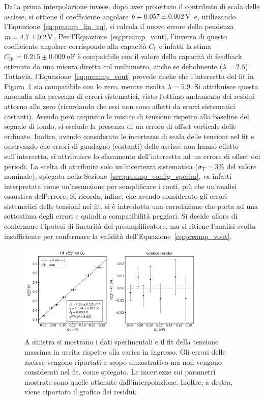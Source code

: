 \noindent Dalla prima interpolazione invece, dopo aver proiettato il contributo di scala
delle ascisse, si ottiene il coefficiente angolare $b=0.057\pm 0.002\,\si{\volt}$ e, utilizzando
l'Equazione~\ref{eq:preamp_lin_eq}, si calcola il nuovo errore della pendenza
$m=4.7\pm0.2 \,\si{\volt}$. Per l'Equazione~\ref{eq:preamp_vout}, l'inverso di questo coefficiente
angolare corrisponde alla capacità $C_{\text f}$ e infatti la stima $C_{\text{fit}}=0.215\pm0.009 \,\si{n\farad}$ è compatibile con il valore della capacità di feedback ottenuto da una misura diretta col multimetro, anche se
debolmente ($\lambda=2.5$). Tuttavia, l'Equazione~\ref{eq:preamp_vout} prevede anche che
l'intercetta del fit in Figura~\ref{fig:preamp_fit_lin} sia compatibile con lo zero, mentre
risulta $\lambda=5.9$. Si attribuisce questa anomalia alla presenza di errori
sistematici, visto l'ottimo andamento dei residui attorno allo zero (ricordando che essi non
sono affetti da erorri sistematici costanti). Avendo
però acquisito le misure di tensione rispetto alla baseline del segnale di fondo, si esclude la presenza di un errore di offset verticale delle ordinate. Inoltre,
avendo considerato le incertezze di scala delle tensioni nel fit e osservando che
errori di guadagno (costanti) delle ascisse non hanno effetto sull'intercetta,
si attribuisce lo sfasamento dell'intercetta ad un errore di
offset dei periodi. La scelta di attribuire solo un'incertezza sistematica ($\sigma_{T}=3\%$ del valore
nominale), spiegata nella Sezione~\ref{sec:preamp_config_sperim}, va infatti interpretata come un'assunzione
per semplificare i conti, più che un'analisi esaustiva dell'errore.
Si ricorda, infine, che avendo considerato gli errori sistematici
delle tensioni nei fit, si è introdotta una correlazione che porta ad una
sottostima degli errori e quindi a compatibilità peggiori. Si decide allora
di confermare l'ipotesi di linearità del preamplificatore, ma si ritiene
l'analisi svolta insufficiente per confermare la validità dell'Equazione~\ref{eq:preamp_vout}.
\begin{figure}[h]
\centering
\includegraphics[width=0.8\textwidth]{../preamp/images/fit_lin}
\caption{\footnotesize A sinistra si mostrano i dati sperimentali e il fit della tensione massima in uscita rispetto alla carica in ingresso. Gli errori delle ascisse vengono riportati
  a scopo dimostrativo ma non vengono considerati nel fit, come spiegato. Le incertezze sui parametri
  mostrate sono quelle ottenute dall'interpolazione. Inoltre, a destra, viene riportato il grafico dei residui.}\label{fig:preamp_fit_lin}
\end{figure}

